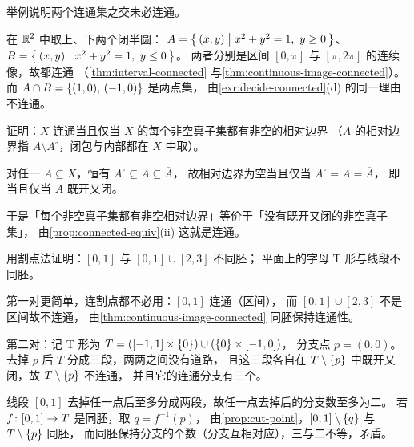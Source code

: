 \begin{exercise}[例行]
  \label{exr:intersection-not-connected}
  举例说明两个连通集之交未必连通。
  \begin{solution}
    在 \(\mathbb{R}^{2}\) 中取上、下两个闭半圆：
    \(A = \left\{\,(x,y) \;\middle|\; x^{2}+y^{2}=1,\ y \ge 0\,\right\}\)、
    \(B = \left\{\,(x,y) \;\middle|\; x^{2}+y^{2}=1,\ y \le 0\,\right\}\)。
    两者分别是区间 \([0,\pi]\) 与 \([\pi,2\pi]\) 的连续像，故都连通
    （\cref{thm:interval-connected} 与\cref{thm:continuous-image-connected}）。
    而 \(A \cap B = \left\{(1,0),\,(-1,0)\right\}\) 是两点集，
    由\cref{exr:decide-connected}(d) 的同一理由不连通。
  \end{solution}
\end{exercise}

\begin{exercise}[例行]
  \label{exr:boundary-criterion}
  证明：\(X\) 连通当且仅当 \(X\) 的每个非空真子集都有非空的相对边界
  （\(A\) 的相对边界指 \(\overline{A} \setminus A^{\circ}\)，闭包与内部都在 \(X\) 中取）。
  \begin{solution}
    对任一 \(A \subseteq X\)，恒有 \(A^{\circ} \subseteq A \subseteq \overline{A}\)，
    故相对边界为空当且仅当 \(A^{\circ} = A = \overline{A}\)，
    即当且仅当 \(A\) 既开又闭。

    于是「每个非空真子集都有非空相对边界」等价于「没有既开又闭的非空真子集」，
    由\cref{prop:connected-equiv}(ii) 这就是连通。
  \end{solution}
\end{exercise}

\begin{exercise}[例行]
  \label{exr:cut-point}
  用割点法证明：\([0,1]\) 与 \([0,1] \cup [2,3]\) 不同胚；
  平面上的字母 T 形与线段不同胚。
  \begin{solution}
    第一对更简单，连割点都不必用：\([0,1]\) 连通（区间），
    而 \([0,1] \cup [2,3]\) 不是区间故不连通，
    由\cref{thm:continuous-image-connected} 同胚保持连通性。

    第二对：记 T 形为 \(T = ([-1,1] \times \left\{0\right\}) \cup (\left\{0\right\} \times [-1,0])\)，
    分支点 \(p = (0,0)\)。去掉 \(p\) 后 \(T\) 分成三段，两两之间没有道路，
    且这三段各自在 \(T \setminus \left\{p\right\}\) 中既开又闭，故 \(T \setminus \left\{p\right\}\) 不连通，
    并且它的连通分支有三个。

    线段 \([0,1]\) 去掉任一点后至多分成两段，故任一点去掉后的分支数至多为二。
    若 \(f \colon [0,1] \to T\) 是同胚，取 \(q = f^{-1}(p)\)，
    由\cref{prop:cut-point}，\([0,1] \setminus \left\{q\right\}\) 与 \(T \setminus \left\{p\right\}\) 同胚，
    而同胚保持分支的个数（分支互相对应），三与二不等，矛盾。
  \end{solution}
\end{exercise}

